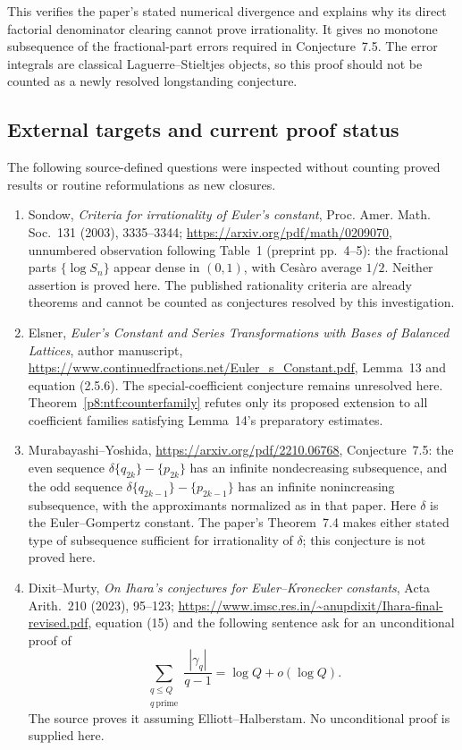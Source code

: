 \documentclass[11pt,a4paper]{article}
\theoremstyle{definition}
\theoremstyle{remark}
\numberwithin{equation}{section}
\begin{document}
This verifies the paper's stated numerical divergence and explains
why its direct factorial denominator clearing cannot prove
irrationality.  It gives no monotone subsequence of the fractional-part
errors required in Conjecture~7.5.  The error integrals are classical
Laguerre--Stieltjes objects, so this proof should not be counted as
a newly resolved longstanding conjecture.

\subsection{External targets and current proof status}

The following source-defined questions were inspected without
counting proved results or routine reformulations as new closures.
\begin{enumerate}
\item Sondow, \emph{Criteria for irrationality of Euler's constant},
Proc. Amer. Math. Soc.\ 131 (2003), 3335--3344;
\url{https://arxiv.org/pdf/math/0209070}, unnumbered observation
following Table~1 (preprint pp.\ 4--5): the fractional parts
$\{\log S_n\}$ appear dense in $(0,1)$, with Ces\`aro average
$1/2$.  Neither assertion is proved here.  The published rationality
criteria are already theorems and cannot be counted as conjectures
resolved by this investigation.
\item Elsner, \emph{Euler's Constant and Series Transformations
with Bases of Balanced Lattices}, author manuscript,
\url{https://www.continuedfractions.net/Euler_s_Constant.pdf},
Lemma~13 and equation (2.5.6).  The special-coefficient conjecture
remains unresolved here.  Theorem~\ref{p8:ntf:counterfamily} refutes
only its proposed extension to all coefficient families satisfying
Lemma~14's preparatory estimates.
\item Murabayashi--Yoshida,
\url{https://arxiv.org/pdf/2210.06768}, Conjecture~7.5:
the even sequence $\delta\{q_{2k}\}-\{p_{2k}\}$ has an infinite
nondecreasing subsequence, and the odd sequence
$\delta\{q_{2k-1}\}-\{p_{2k-1}\}$ has an infinite nonincreasing
subsequence, with the approximants normalized as in that paper.
Here $\delta$ is the Euler--Gompertz constant.  The paper's
Theorem~7.4 makes either stated type of subsequence sufficient for
irrationality of $\delta$; this conjecture is not proved here.
\item Dixit--Murty, \emph{On Ihara's conjectures for Euler--Kronecker
constants}, Acta Arith.\ 210 (2023), 95--123;
\url{https://www.imsc.res.in/~anupdixit/Ihara-final-revised.pdf},
equation (15) and the following sentence ask for an unconditional
proof of
\[
 \sum_{\substack{q\leq Q\\q\ \mathrm{prime}}}
       \frac{|\gamma_q|}{q-1}=\log Q+o(\log Q).
\]
The source proves it assuming Elliott--Halberstam.  No
unconditional proof is supplied here.
\end{enumerate}
\end{document}
